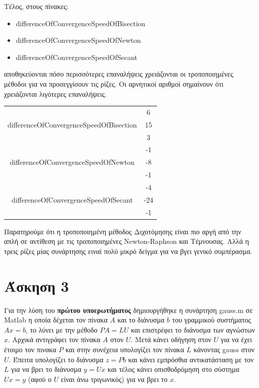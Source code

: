 \documentclass[a4paper,11pt]{article}
\begin{document}
\begin{flushleft}
Τέλος, στους πίνακες:
\begin{itemize}
    \item differenceOfConvergenceSpeedOfBisection
    \item differenceOfConvergenceSpeedOfNewton
    \item differenceOfConvergenceSpeedOfSecant
\end{itemize} 
αποθηκεύονται πόσο περισσότερες επαναλήψεις χρειάζονται	οι τροποποιημένες μέθοδοι για να προσεγγίσουν τις ρίζες. 
\linebreak
Οι αρνητικοί αριθμοί σημαίνουν ότι χρειάζονται λιγότερες επαναλήψεις.

\begin{center}
    \begin{tabular}{|c|c|}
        \hline
        \multirow{3}{*}{differenceOfConvergenceSpeedOfBisection} & 6 \\ \cline{2-2} & 15 \\ \cline{2-2} & 3 \\ \hline
        \multirow{3}{*}{differenceOfConvergenceSpeedOfNewton} & -1 \\ \cline{2-2} & -8 \\ \cline{2-2} & -1 \\ \hline
        \multirow{3}{*}{differenceOfConvergenceSpeedOfSecant} & -4 \\ \cline{2-2} & -24 \\ \cline{2-2} & -1 \\ \hline   
    \end{tabular}
\end{center}

Παρατηρούμε ότι η τροποποιημένη μέθοδος Διχοτόμησης είναι πιο αργή από την απλή σε αντίθεση με τις τροποποιημένες Newton-Raphson και Τέμνουσας. Αλλά η τρεις ρίζες μίας συνάρτησης ειναί πολύ μικρό δείγμα για να βγει γενικό συμπέρασμα. 

\section*{Άσκηση 3}
Για την λύση του \textbf{πρώτου υποερωτήματος} δημιουργήθηκε η συνάρτηση gauss.m σε Matlab η οποία δέχεται τον πίνακα $A$ και το διάνυσμα $b$ του γραμμικού συστήματος $Ax = b$, το λύνει με την μέθοδο $PA = LU$ και επιστρέφει το διάνυσμα των αγνώστων $x$.
\linebreak
Αρχικά αντιγράφει τον πίνακα $A$ στον $U$. Μετά κάνει οδήγηση στον $U$ για να έχει έτοιμο τον πινακα $P$ και στην συνέχεια υπολογίζει τον πίνακα $L$ κάνοντας gauss στον $U$. Έπειτα υπολογίζει το διάνυσμα $z = Pb$ και κάνει εμπρόσθια αντικατάσταση με τον $L$ για να βρει το διάνυσμα $y = Ux$ και τέλος κάνει οπισθοδρόμηση στο σύστημα $Ux=y$ (αφού ο $U$ είναι άνω τριγωνικός) για να βρει το $x$.
\linebreak


\end{flushleft}
\end{document}
